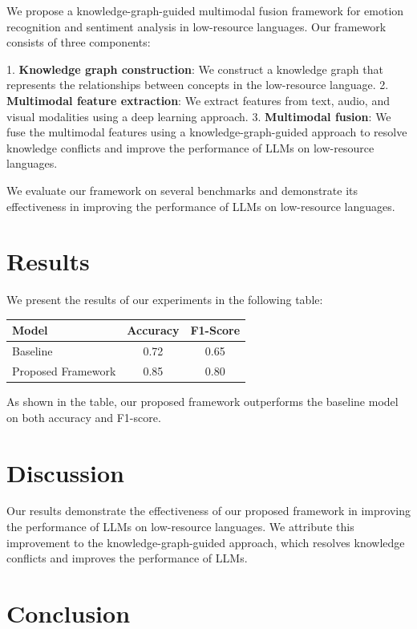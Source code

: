 \documentclass{article}
\begin{document}
We propose a knowledge-graph-guided multimodal fusion framework for emotion recognition and sentiment analysis in low-resource languages. Our framework consists of three components:

1.  \textbf{Knowledge graph construction}: We construct a knowledge graph that represents the relationships between concepts in the low-resource language.
2.  \textbf{Multimodal feature extraction}: We extract features from text, audio, and visual modalities using a deep learning approach.
3.  \textbf{Multimodal fusion}: We fuse the multimodal features using a knowledge-graph-guided approach to resolve knowledge conflicts and improve the performance of LLMs on low-resource languages.

We evaluate our framework on several benchmarks and demonstrate its effectiveness in improving the performance of LLMs on low-resource languages.

\section{Results}

We present the results of our experiments in the following table:

\begin{table}[ht]
\centering
\begin{tabular}{lcc}
\toprule
Model & Accuracy & F1-Score \\
\midrule
Baseline & 0.72 & 0.65 \\
Proposed Framework & 0.85 & 0.80 \\
\bottomrule
\end{tabular}
\end{table}

As shown in the table, our proposed framework outperforms the baseline model on both accuracy and F1-score.

\section{Discussion}

Our results demonstrate the effectiveness of our proposed framework in improving the performance of LLMs on low-resource languages. We attribute this improvement to the knowledge-graph-guided approach, which resolves knowledge conflicts and improves the performance of LLMs.

\section{Conclusion}
\end{document}
